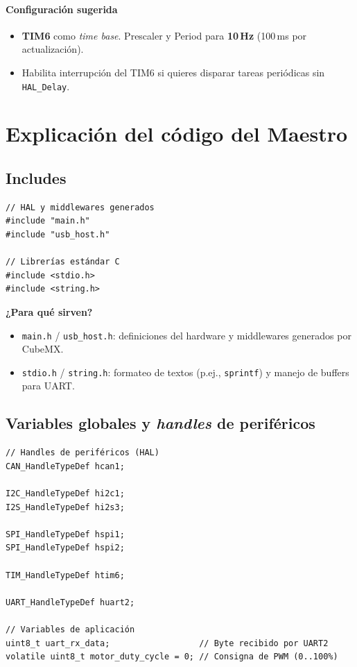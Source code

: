 \documentclass[a4paper,12pt]{article}
\begin{document}
\paragraph{Configuración sugerida}
\begin{itemize}
  \item \textbf{TIM6} como \textit{time base}. Prescaler y Period para \textbf{10\,Hz} (100\,ms por actualización).
  \item Habilita interrupción del TIM6 si quieres disparar tareas periódicas sin \texttt{HAL\_Delay}.
\end{itemize}


\section{Explicación del código del Maestro}

\subsection{Includes}
\begin{lstlisting}
// HAL y middlewares generados
#include "main.h"
#include "usb_host.h"

// Librerías estándar C
#include <stdio.h>
#include <string.h>
\end{lstlisting}

\noindent\textbf{¿Para qué sirven?} 
\begin{itemize}
  \item \texttt{main.h} / \texttt{usb\_host.h}: definiciones del hardware y middlewares generados por CubeMX.
  \item \texttt{stdio.h} / \texttt{string.h}: formateo de textos (p.ej., \texttt{sprintf}) y manejo de buffers para UART.
\end{itemize}

\subsection{Variables globales y \textit{handles} de periféricos}
\begin{lstlisting}
// Handles de periféricos (HAL)
CAN_HandleTypeDef hcan1;

I2C_HandleTypeDef hi2c1;
I2S_HandleTypeDef hi2s3;

SPI_HandleTypeDef hspi1;
SPI_HandleTypeDef hspi2;

TIM_HandleTypeDef htim6;

UART_HandleTypeDef huart2;

// Variables de aplicación
uint8_t uart_rx_data;                  // Byte recibido por UART2
volatile uint8_t motor_duty_cycle = 0; // Consigna de PWM (0..100%)
\end{lstlisting}
\end{document}
